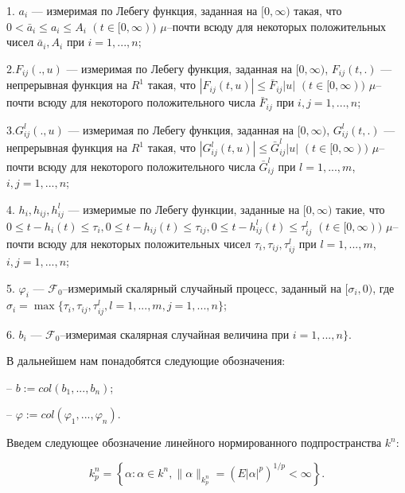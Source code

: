1.  $a_i$ --- измеримая по Лебегу функция, заданная на $[0, \infty)$
такая, что $0 < \bar a_i \leq a_i \leq A_i {\,} {\,} (t \in [0,
\infty))$ $\mu $--почти всюду для некоторых  положительных чисел
$\bar a_i, A_i$ при $i = 1,...,n$;

2.$F_{ij}(.,u)$ --- измеримая по Лебегу функция, заданная на $[0,
\infty)$,  $F_{ij}(t,.)$ --- непрерывная функция на $R^1$ такая, что
$|F_{ij}(t,u)| \leq \bar F_{ij}|u| {\,} {\,} (t \in [0, \infty))$
$\mu $--почти всюду для некоторого положительного числа $\bar
F_{ij}$ при $i,j = 1,...,n$;

3.$G^l_{ij}(.,u)$ --- измеримая по Лебегу функция, заданная на $[0,
\infty)$,  $G^l_{ij}(t,.)$ --- непрерывная функция на $R^1$ такая,
что $|G^l_{ij}(t,u)| \leq \bar G^l_{ij}|u| {\,} {\,} (t \in [0,
\infty))$ $\mu $--почти всюду для некоторого положительного числа
$\bar G^l_{ij}$ при $l = 1,...,m$, $i,j = 1,...,n$;

4.  $h_i, h_{ij}, h^l_{ij}$ --- измеримые по Лебегу функции,
заданные на $[0, \infty)$ такие, что $0 \leq t- h_i(t) \leq \tau _i,
0 \leq t- h_{ij}(t) \leq \tau _{ij}, 0 \leq t- h^l_{ij}(t) \leq \tau
^l_{ij} {\,} {\,} (t \in [0, \infty))$ $\mu $--почти всюду для
некоторых положительных чисел $\tau_i, \tau_{ij}, \tau^l_{ij}$ при
$l = 1,...,m$, $i, j = 1,...,n$;

5.  $\varphi_i$ --- ${\mathcal F}_0$--измеримый скалярный случайный
процесс, заданный на $[\sigma _i, 0)$, где $\sigma _i = \max \{
\tau_i, \tau_{ij}, \tau^l_{ij}, l = 1,...,m, j = 1,...,n \}$;

6.  $b_i$ --- ${\mathcal F}_0$--измеримая скалярная случайная
величина  при  $i = 1,...,n \}$.

В дальнейшем нам понадобятся следующие обозначения:

\noindent-- $b:= col (b_1,...,b_n)$;

\noindent-- $\varphi:= col (\varphi_1,...,\varphi_n)$.

Введем следующее обозначение линейного нормированного
подпространства $k^n$:

$$
k_p^n = \left \{\alpha: \alpha \in k^n,\|\alpha\|_{k_p^n} =
(E|\alpha |^p)^{1/p} < \infty \right \}.
$$

